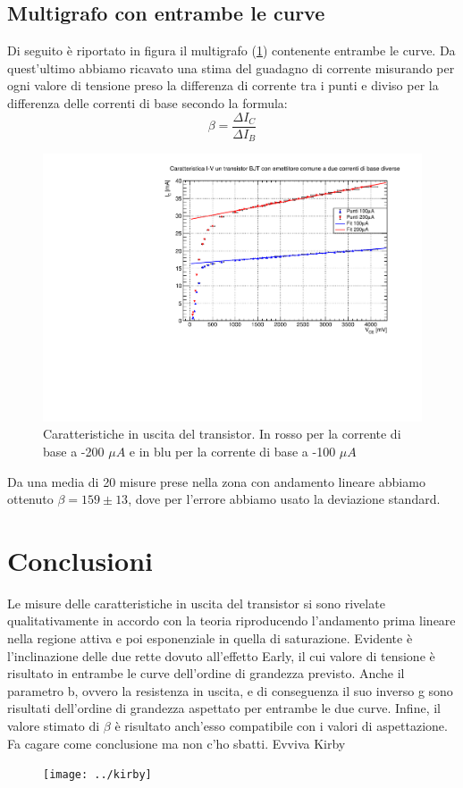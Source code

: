 \documentclass[]{article}
\begin{document}
\subsection{Multigrafo con entrambe le curve}
Di seguito è riportato in figura il multigrafo (\ref{fig:multigrafo}) contenente entrambe le curve. Da quest'ultimo abbiamo ricavato una stima del guadagno di corrente misurando per ogni valore di tensione preso la differenza di corrente tra i punti e diviso per la differenza delle correnti di base secondo la formula:
\begin{equation}
	\beta=\frac{\Delta I_{C}}{\Delta I_{B}}
\end{equation}
	\begin{figure}[H]
		\centering
		\includegraphics[width=0.9\linewidth]{../c1}
		\caption{Caratteristiche in uscita del transistor. In rosso per la corrente di base a -200 $ \mu A $ e in blu per la corrente di base a -100 $ \mu A $}
		\label{fig:multigrafo}
	\end{figure}
Da una media di 20 misure prese nella zona con andamento lineare abbiamo ottenuto $ \beta =159\pm 13 $, dove per l'errore abbiamo usato la deviazione standard.
\section*{Conclusioni}
Le misure delle caratteristiche in uscita del transistor si sono rivelate qualitativamente in accordo con la teoria riproducendo l'andamento prima lineare nella regione attiva e poi esponenziale in quella di saturazione. Evidente è l'inclinazione delle due rette dovuto all'effetto Early, il cui valore di tensione è risultato in entrambe le curve dell'ordine di grandezza previsto.  
Anche il parametro b, ovvero la resistenza in uscita, e di conseguenza il suo inverso g sono risultati dell'ordine di grandezza aspettato per entrambe le due curve. 
Infine, il valore stimato di $ \beta $ è risultato anch'esso compatibile con i valori di aspettazione.
Fa cagare come conclusione ma non c'ho sbatti. Evviva Kirby
\newpage
\begin{figure}
	\centering
	\texttt{[image: ../kirby]}
\end{figure}
\end{document}
